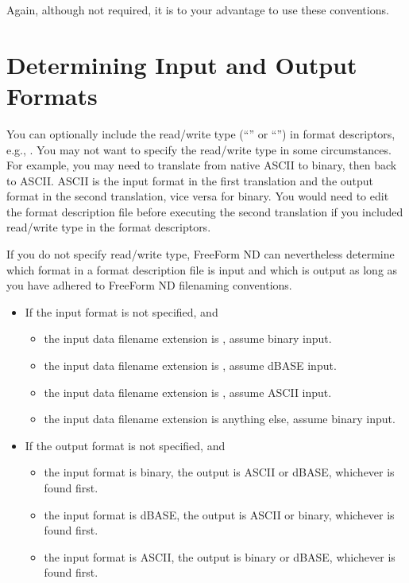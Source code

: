 Again, although not required, it is to your advantage to use these
conventions.

\section{Determining Input and Output Formats}
\label{ff,convs,determine}

You can optionally include the read/write type (``'' or
``'') in format descriptors, e.g.,
. You may not want to specify the read/write
type in some circumstances. For example, you may need to translate
from native ASCII to binary, then back to ASCII. ASCII is the input
format in the first translation and the output format in the second
translation, vice versa for binary. You would need to edit the format
description file before executing the second translation if you
included read/write type in the format descriptors.

 
If you do not specify read/write type, FreeForm ND can nevertheless
determine which format in a format description file is input and which
is output as long as you have adhered to FreeForm ND filenaming
conventions.

\begin{itemize}
\item   If the input format is not specified, and 
  \begin{itemize}
    
  \item the input data filename extension is , assume binary
    input.
  \item the input data filename extension is , assume
    dBASE input.
  \item the input data filename extension is , assume ASCII input.
  \item the input data filename extension is anything else, assume
    binary input.
\end{itemize}

\item   If the output format is not specified, and 
  \begin{itemize}
  \item the input format is binary, the output is ASCII or dBASE,
    whichever is found first.
  \item the input format is dBASE, the output is ASCII or binary,
    whichever is found first.
  \item the input format is ASCII, the output is binary or dBASE,
    whichever is found first.  
\end{itemize}
\end{itemize}

